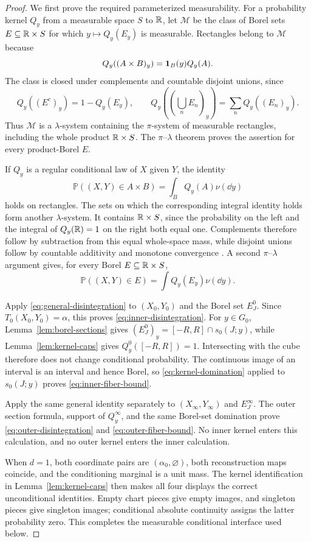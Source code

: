 \begin{proof}
We first prove the required parameterized measurability.  For a probability
kernel $Q_y$ from a measurable space $S$ to $\mathbb{R}$, let $\mathcal M$ be the
class of Borel sets $E\subseteq\mathbb{R}\times S$ for which
$y\mapsto Q_y(E_y)$ is measurable.  Rectangles belong to $\mathcal M$
because
\[
Q_y((A\times B)_y)=\mathbf{1}_B(y)Q_y(A).
\]
The class is closed under complements and countable disjoint unions, since
\[
Q_y((E^c)_y)=1-Q_y(E_y),\qquad
Q_y\left(\left(\bigcup_nE_n\right)_y\right)=\sum_nQ_y((E_n)_y).
\]
Thus $\mathcal M$ is a $\lambda$-system containing the $\pi$-system of
measurable rectangles, including the whole product $\mathbb{R}\times S$.  The
$\pi$--$\lambda$ theorem \cite[Theorem~1.1]{Kallenberg2002} proves the assertion
for every product-Borel $E$.

If $Q_y$ is a regular conditional law of $X$ given $Y$, the identity
\[
\mathbb P((X,Y)\in A\times B)=\int_BQ_y(A)\nu(\dd y)
\]
holds on rectangles.  The sets on which the corresponding integral identity
holds form another $\lambda$-system.  It contains $\mathbb{R}\times S$, since the
probability on the left and the integral of $Q_y(\mathbb{R})=1$ on the right both
equal one.  Complements therefore follow by subtraction from this equal
whole-space mass, while disjoint unions follow by countable additivity and
monotone convergence \cite[Theorem~2.14]{Folland1999}.  A second
$\pi$--$\lambda$ argument \cite[Theorem~1.1]{Kallenberg2002} gives, for every Borel
$E\subseteq\mathbb{R}\times S$,
\begin{equation}
\mathbb P((X,Y)\in E)=\int Q_y(E_y)\nu(\dd y).
\label{eq:general-disintegration}
\end{equation}

Apply \eqref{eq:general-disintegration} to $(X_0,Y_0)$ and the Borel set
$E^0_J$.  Since $T_0(X_0,Y_0)=\alpha$, this proves
\eqref{eq:inner-disintegration}.  For $y\in G_0$,
Lemma~\ref{lem:borel-sections} gives
$(E^0_J)_y=[-R,R]\cap s_0(J;y)$, while Lemma~\ref{lem:kernel-caps} gives
$Q^0_y([-R,R])=1$.  Intersecting with the cube therefore does not change
conditional probability.  The continuous image of an interval is an
interval and hence Borel, so \eqref{eq:kernel-domination} applied to
$s_0(J;y)$ proves \eqref{eq:inner-fiber-bound}.

Apply the same general identity separately to $(X_\infty,Y_\infty)$ and
$E^\infty_J$.  The outer section formula, support of $Q^\infty_y$, and the
same Borel-set domination prove \eqref{eq:outer-disintegration} and
\eqref{eq:outer-fiber-bound}.  No inner kernel enters this calculation, and
no outer kernel enters the inner calculation.

When $d=1$, both coordinate pairs are $(\alpha_0,\varnothing)$, both
reconstruction maps coincide, and the conditioning marginal is a unit mass.
The kernel identification in Lemma~\ref{lem:kernel-caps} then makes all four
displays the correct unconditional identities.  Empty chart pieces give
empty images, and singleton pieces give singleton images; conditional
absolute continuity assigns the latter probability zero.  This completes
the measurable conditional interface used below.
\end{proof}


